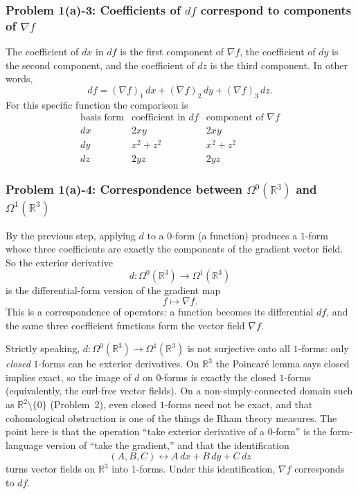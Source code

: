 \documentclass[11pt]{article}
\newcommand{\R}{\mathbb{R}}
\newcommand{\Om}{\Omega}
\begin{document}
\subsubsection*{Problem 1(a)-3: Coefficients of $df$ correspond to components of $\nabla f$}

The coefficient of $dx$ in $df$ is the first component of $\nabla f$, the coefficient of $dy$ is the second component, and the coefficient of $dz$ is the third component. In other words,
\[
 df=(\nabla f)_1\,dx+(\nabla f)_2\,dy+(\nabla f)_3\,dz.
\]
For this specific function the comparison is
\[
\begin{array}{c|c|c}
\text{basis form} & \text{coefficient in }df & \text{component of }\nabla f\\ \hline
dx & 2xy & 2xy\\
dy & x^2+z^2 & x^2+z^2\\
dz & 2yz & 2yz
\end{array}
\]

\subsubsection*{Problem 1(a)-4: Correspondence between $\Omega^0(\R^3)$ and $\Omega^1(\R^3)$}

By the previous step, applying $d$ to a $0$-form (a function) produces a $1$-form whose three coefficients are exactly the components of the gradient vector field. So the exterior derivative
\[
 d:\Om^0(\R^3)\longrightarrow \Om^1(\R^3)
\]
is the differential-form version of the gradient map
\[
 f\longmapsto \nabla f.
\]
This is a correspondence of operators: a function becomes its differential $df$, and the same three coefficient functions form the vector field $\nabla f$.

Strictly speaking, $d:\Om^0(\R^3)\to\Om^1(\R^3)$ is not surjective onto all $1$-forms: only \emph{closed} $1$-forms can be exterior derivatives. On $\R^3$ the Poincar\'e lemma says closed implies exact, so the image of $d$ on $0$-forms is exactly the closed $1$-forms (equivalently, the curl-free vector fields). On a non-simply-connected domain such as $\R^2\setminus\{0\}$ (Problem~2), even closed $1$-forms need not be exact, and that cohomological obstruction is one of the things de Rham theory measures. The point here is that the operation ``take exterior derivative of a $0$-form'' is the form-language version of ``take the gradient,'' and that the identification
\[
 (A,B,C)\longleftrightarrow A\,dx+B\,dy+C\,dz
\]
turns vector fields on $\R^3$ into $1$-forms. Under this identification, $\nabla f$ corresponds to $df$.
\end{document}
